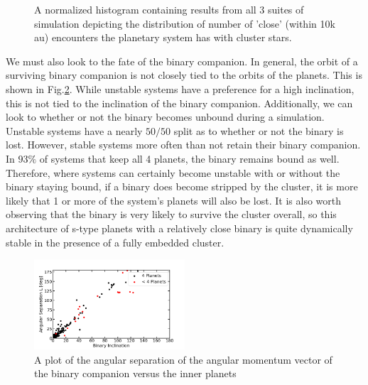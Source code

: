 \documentclass[manuscript]{aastex631}
\begin{document}
\begin{figure}
    \caption{A normalized histogram containing results from all 3 suites of simulation depicting the distribution of 
    number of 'close' (within 10k au) encounters the planetary system has with cluster stars.}
    \label{fig:close_hist}
\end{figure}
We must also look to the fate of the binary companion. In general, the orbit of a surviving binary companion is not 
closely tied to the orbits of the planets. This is shown in Fig.\ref{fig:ang_correlation}. While unstable systems have a preference 
for a high inclination, this is not tied to the inclination of the binary companion. Additionally, we can look to whether or not the binary 
becomes unbound during a simulation. Unstable systems have a nearly $50/50$ split as to whether or not the binary is lost. However, stable systems 
more often than not retain their binary companion. In $93\%$ of systems that keep all 4 planets, the binary remains bound as well. Therefore,
where systems can certainly become unstable with or without the binary staying bound, if a binary does become stripped by the cluster, it is more likely
that 1 or more of the system's planets will also be lost. It is also worth observing that the binary is very likely to survive the cluster overall, so this
architecture of s-type planets with a relatively close binary is quite dynamically stable in the presence of a fully embedded cluster.  
\begin{figure}
    \centering
    \includegraphics[width=0.5\textwidth]{fig/coupling_scatter_ang_80m.png}
    \caption{A plot of the angular separation of the angular momentum vector of the binary companion versus the inner planets}
    \label{fig:ang_correlation}
\end{figure}
\end{document}

